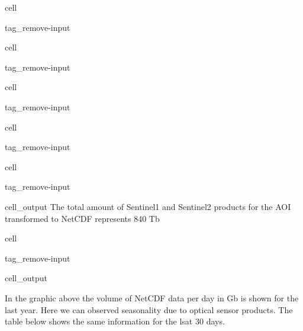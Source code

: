 \documentclass[letterpaper,10pt,english]{jupyterBook}
\begin{document}
\begin{sphinxuseclass}{cell}
\begin{sphinxuseclass}{tag_remove-input}
\end{sphinxuseclass}
\end{sphinxuseclass}
\begin{sphinxuseclass}{cell}
\begin{sphinxuseclass}{tag_remove-input}
\end{sphinxuseclass}
\end{sphinxuseclass}
\begin{sphinxuseclass}{cell}
\begin{sphinxuseclass}{tag_remove-input}
\end{sphinxuseclass}
\end{sphinxuseclass}
\begin{sphinxuseclass}{cell}
\begin{sphinxuseclass}{tag_remove-input}
\end{sphinxuseclass}
\end{sphinxuseclass}
\begin{sphinxuseclass}{cell}
\begin{sphinxuseclass}{tag_remove-input}\begin{sphinxVerbatimOutput}

\begin{sphinxuseclass}{cell_output}
\sphinxAtStartPar
The total amount of Sentinel\sphinxhyphen{}1 and Sentinel\sphinxhyphen{}2 products for the AOI transformed to NetCDF represents 840 Tb

\end{sphinxuseclass}\end{sphinxVerbatimOutput}

\end{sphinxuseclass}
\end{sphinxuseclass}
\begin{sphinxuseclass}{cell}
\begin{sphinxuseclass}{tag_remove-input}\begin{sphinxVerbatimOutput}

\begin{sphinxuseclass}{cell_output}
\noindent{}

\end{sphinxuseclass}\end{sphinxVerbatimOutput}

\end{sphinxuseclass}
\end{sphinxuseclass}
\sphinxAtStartPar
In the graphic above the volume of NetCDF data per day in Gb is shown for the last year. Here we can observed seasonality due to optical sensor products. The table below shows the same information for the lsat 30 days.
\end{document}
